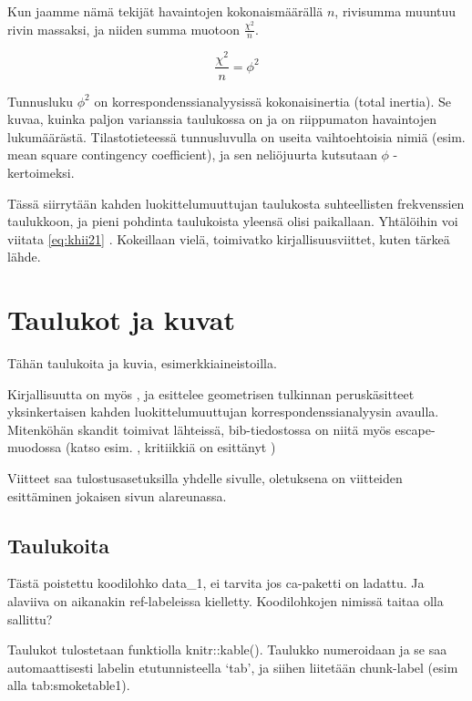 \documentclass[finnish,]{book}
\begin{document}
Kun jaamme nämä tekijät havaintojen kokonaismäärällä \(n\), rivisumma muuntuu rivin massaksi, ja niiden summa muotoon \(\frac{\chi^{2}}{n}\).

\begin{equation}
 \frac{\chi^{2}}{n} = \phi^{2}
 \label{eq:inert1}
\end{equation}

Tunnusluku \(\phi^{2}\) on korrespondenssianalyysissä kokonaisinertia (total inertia). Se kuvaa, kuinka paljon varianssia taulukossa on ja on riippumaton havaintojen lukumäärästä. Tilastotieteessä tunnusluvulla on useita vaihtoehtoisia nimiä (esim. mean square contingency coefficient), ja sen neliöjuurta kutsutaan \(\phi\) - kertoimeksi.

Tässä siirrytään kahden luokittelumuuttujan taulukosta suhteellisten frekvenssien taulukkoon, ja pieni pohdinta taulukoista yleensä olisi paikallaan. Yhtälöihin voi viitata \eqref{eq:khii21} . Kokeillaan vielä, toimivatko kirjallisuusviittet, kuten tärkeä lähde\citep{RefWorks:55}.

\hypertarget{taulukot-ja-kuvat}{%
\chapter{Taulukot ja kuvat}\label{taulukot-ja-kuvat}}

Tähän taulukoita ja kuvia, esimerkkiaineistoilla.

Kirjallisuutta on myös \citep{RefWorks:68}, ja \citep{RefWorks:57} esittelee geometrisen tulkinnan peruskäsitteet yksinkertaisen kahden luokittelumuuttujan korrespondenssianalyysin avaulla. Mitenköhän skandit toimivat lähteissä, bib-tiedostossa on niitä myös escape-muodossa (katso esim. \citep{RefWorks:100}, kritiikkiä on esittänyt \citep{RefWorks:110})

Viitteet saa tulostusasetuksilla yhdelle sivulle, oletuksena on viitteiden esittäminen jokaisen sivun alareunassa.

\hypertarget{taulukoita}{%
\section{Taulukoita}\label{taulukoita}}

Tästä poistettu koodilohko data\_1, ei tarvita jos ca-paketti on ladattu. Ja alaviiva on aikanakin ref-labeleissa kielletty. Koodilohkojen nimissä taitaa olla sallittu?

Taulukot tulostetaan funktiolla knitr::kable(). Taulukko numeroidaan ja se saa automaattisesti labelin etutunnisteella `tab', ja siihen liitetään chunk-label (esim alla tab:smoketable1).
\end{document}
